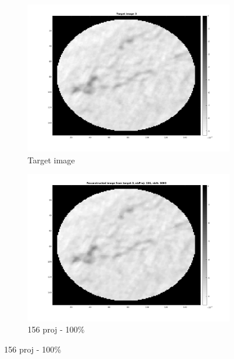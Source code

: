 \documentclass[10pt,a4paper,titlepage]{article}
\begin{document}
		\begin{figure}[H]
		
       		\centering
      		\begin{subfigure}[b]{0.32\textwidth}
            	\centering
            	\includegraphics[width=\textwidth]{Sample3/target3.png}
            	\caption{Target image}    
        	\end{subfigure}
        	\begin{subfigure}[b]{0.32\textwidth}  
            	\centering 
            	\includegraphics[width=\textwidth]{Sample3/L-D_5000/156p.png}
            	\caption{156 proj - 100\%}    
            	\label{subfig:156p3L-D}
        	\end{subfigure}

\end{figure}
\end{document}
